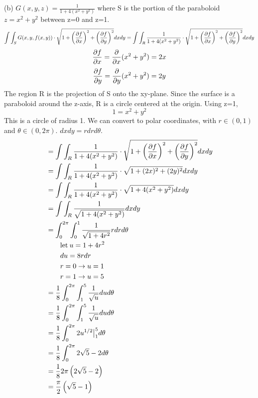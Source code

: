 \documentclass{article}
\begin{document}
\begin{enumerate}
    (b) $G(x,y,z) = \frac{1}{1 + 4(x^2 + y^2)}$ where S is the portion of the paraboloid $z = x^2 + y^2$ between z=0 and z=1.
    \[ \int\int_S{G(x,y,f(x,y))} \cdot \sqrt{1 + {\left( \pd{x} \right)}^2 + {\left( \pd{y} \right)}^2}dxdy = \int\int_R{\frac{1}{1 + 4(x^2 + y^2)}} \cdot \sqrt{1 + \left(\pd{x}\right)^2 + \left(\pd{y}\right)^2}dxdy \]
    \[ \pd{x} = \pd[]{x}{(x^2 + y^2)} = 2x \]
    \[ \pd{y} = \pd[]{y}{(x^2 + y^2)} = 2y \]
    The region R is the projection of S onto the xy-plane. Since the surface is a paraboloid around
    the z-axis, R is a circle centered at the origin. Using z=1,
    \[ 1 = x^2 + y^2 \]
    This is a circle of radius 1. We can convert to polar coordinates, with $r \in (0,1)$ and
    $\theta \in (0,2\pi)$. $dxdy = rdrd\theta$.
    \begin{align*}
        &= \int\int_R{\frac{1}{1 + 4(x^2 + y^2)}} \cdot \sqrt{1 + \left(\pd{x}\right)^2 + \left(\pd{y}\right)^2}dxdy \\
        &= \int\int_R{\frac{1}{1 + 4(x^2 + y^2)}} \cdot \sqrt{1 + (2x)^2 + (2y)^2}dxdy \\
        &= \int\int_R{\frac{1}{1 + 4(x^2 + y^2)}} \cdot \sqrt{1 + 4(x^2 + y^2)}dxdy \\
        &= \int\int_R{\frac{1}{\sqrt{1 + 4(x^2 + y^2)}}} dxdy \\
        &= \int_0^{2\pi}\int_0^1{\frac{1}{\sqrt{1 + 4r^2}}} rdrd\theta \\
        & \qquad \textnormal{let} \: u = 1 + 4r^2 \\
        & \qquad du = 8rdr \\
        & \qquad r=0 \rightarrow u=1 \\
        & \qquad r=1 \rightarrow u=5 \\
        &= \frac{1}{8}\int_0^{2\pi}\int_1^5{\frac{1}{\sqrt{u}}} dud\theta \\
        &= \frac{1}{8}\int_0^{2\pi}\int_1^5{\frac{1}{\sqrt{u}}} dud\theta \\
        &= \frac{1}{8}\int_0^{2\pi}{ 2u^{1/2} } \big{|}_1^5 d\theta \\
        &= \frac{1}{8}\int_0^{2\pi}{ 2\sqrt{5} - 2 } d\theta \\
        &= \frac{1}{8}{2\pi}\left({ 2\sqrt{5} - 2 }\right) \\
        &= \frac{\pi}{2}\left({ \sqrt{5} - 1 }\right) \\
    \end{align*}


\end{enumerate}
\end{document}
